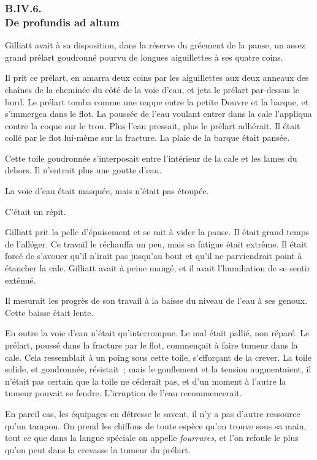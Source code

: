 \documentclass[french,twoside]{book} %
\begin{document}
 \subsubsection[{B.IV.6. De profundis ad altum}]{B.IV.6. \\
De profundis ad altum}
\noindent Gilliatt avait à sa disposition, dans la réserve du gréement de la panse, un assez grand prélart goudronné pourvu de longues aiguillettes à ses quatre coins.\par
Il prit ce prélart, en amarra deux coins par les aiguillettes aux deux anneaux des chaînes de la cheminée du côté de la voie d’eau, et jeta le prélart par-dessus le bord. Le prélart tomba comme une nappe entre la petite Douvre et la barque, et s’immergea dans le flot. La poussée de l’eau voulant entrer dans la cale l’appliqua contre la coque sur le trou. Plus l’eau pressait, plus le prélart adhérait. Il était collé par le flot lui-même sur la fracture. La plaie de la barque était pansée.\par
Cette toile goudronnée s’interposait entre l’intérieur de la cale et les lames du dehors. Il n’entrait plus une goutte d’eau.\par
La voie d’eau était masquée, mais n’était pas étoupée.\par
 C’était un répit.\par
Gilliatt prit la pelle d’épuisement et se mit à vider la panse. Il était grand temps de l’alléger. Ce travail le réchauffa un peu, mais sa fatigue était extrême. Il était forcé de s’avouer qu’il n’irait pas jusqu’au bout et qu’il ne parviendrait point à étancher la cale. Gilliatt avait à peine mangé, et il avait l’humiliation de se sentir exténué.\par
Il mesurait les progrès de son travail à la baisse du niveau de l’eau à ses genoux. Cette baisse était lente.\par
En outre la voie d’eau n’était qu’interrompue. Le mal était pallié, non réparé. Le prélart, poussé dans la fracture par le flot, commençait à faire tumeur dans la cale. Cela ressemblait à un poing sous cette toile, s’efforçant de la crever. La toile solide, et goudronnée, résistait ; mais le gonflement et la tension augmentaient, il n’était pas certain que la toile ne céderait pas, et d’un moment à l’autre la tumeur pouvait se fendre. L’irruption de l’eau recommencerait.\par
En pareil cas, les équipages en détresse le savent, il n’y a pas d’autre ressource qu’un tampon. On prend les chiffons de toute espèce qu’on trouve sous sa main, tout ce que dans la langue spéciale on appelle \emph{fourrures,} et l’on refoule le plus qu’on peut dans la crevasse la tumeur du prélart.\par
\end{document}
